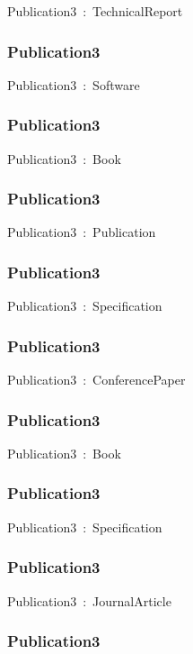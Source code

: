 \documentclass{article}
\begin{document}
Publication3~:~TechnicalReport

\subsubsection*{Publication3}

Publication3~:~Software

\subsubsection*{Publication3}

Publication3~:~Book

\subsubsection*{Publication3}

Publication3~:~Publication

\subsubsection*{Publication3}

Publication3~:~Specification

\subsubsection*{Publication3}

Publication3~:~ConferencePaper

\subsubsection*{Publication3}

Publication3~:~Book

\subsubsection*{Publication3}

Publication3~:~Specification

\subsubsection*{Publication3}

Publication3~:~JournalArticle

\subsubsection*{Publication3}
\end{document}
